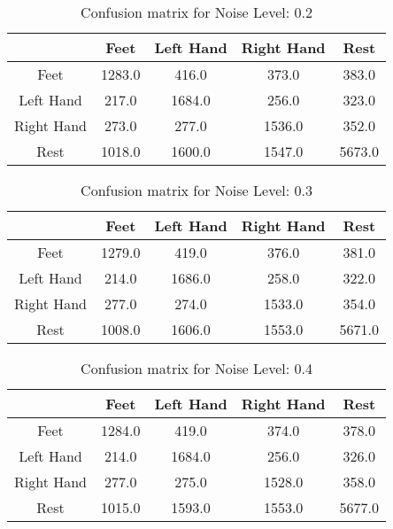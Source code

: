 \begin{table}[!htbp]
    \centering
    \begin{tabular}{|c||c|c|c|c|}
        \hline
		 & Feet & Left Hand & Right Hand & Rest \\
        \hline
        \hline
        Feet & 1283.0 & 416.0 & 373.0 & 383.0 \\
        \hline
        Left Hand & 217.0 & 1684.0 & 256.0 & 323.0 \\
        \hline
        Right Hand & 273.0 & 277.0 & 1536.0 & 352.0 \\
        \hline
        Rest & 1018.0 & 1600.0 & 1547.0 & 5673.0 \\
        \hline
    \end{tabular}
    \caption{Confusion matrix for Noise Level: 0.2}
\end{table}

\begin{table}[!htbp]
    \centering
    \begin{tabular}{|c||c|c|c|c|}
        \hline
		 & Feet & Left Hand & Right Hand & Rest \\
        \hline
        \hline
        Feet & 1279.0 & 419.0 & 376.0 & 381.0 \\
        \hline
        Left Hand & 214.0 & 1686.0 & 258.0 & 322.0 \\
        \hline
        Right Hand & 277.0 & 274.0 & 1533.0 & 354.0 \\
        \hline
        Rest & 1008.0 & 1606.0 & 1553.0 & 5671.0 \\
        \hline
    \end{tabular}
    \caption{Confusion matrix for Noise Level: 0.3}
\end{table}

\begin{table}[!htbp]
    \centering
    \begin{tabular}{|c||c|c|c|c|}
        \hline
		 & Feet & Left Hand & Right Hand & Rest \\
        \hline
        \hline
        Feet & 1284.0 & 419.0 & 374.0 & 378.0 \\
        \hline
        Left Hand & 214.0 & 1684.0 & 256.0 & 326.0 \\
        \hline
        Right Hand & 277.0 & 275.0 & 1528.0 & 358.0 \\
        \hline
        Rest & 1015.0 & 1593.0 & 1553.0 & 5677.0 \\
        \hline
    \end{tabular}
    \caption{Confusion matrix for Noise Level: 0.4}
\end{table}


